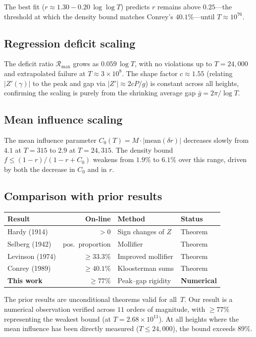 \documentclass[11pt,a4paper]{article}
\begin{document}
The best fit ($r \approx 1.30 - 0.20\,\log\log T$) predicts $r$ remains above $0.25$---the threshold at which the density bound matches Conrey's $40.1\%$---until $T \approx 10^{76}$.

\subsection{Regression deficit scaling}

The deficit ratio $\mathcal{R}_{\max}$ grows as $0.059\,\log T$, with no violations up to $T = 24{,}000$ and extrapolated failure at $T \approx 3 \times 10^8$.
The shape factor $c \approx 1.55$ (relating $|Z'(\gamma)|$ to the peak and gap via $|Z'| \approx 2cP/g$) is constant across all heights, confirming the scaling is purely from the shrinking average gap $\bar{g} = 2\pi/\log T$.

\subsection{Mean influence scaling}

The mean influence parameter $C_0(T) = M \cdot |\mathrm{mean}(\delta r)|$ decreases slowly from $4.1$ at $T = 315$ to $2.9$ at $T = 24{,}315$.
The density bound $f \leq (1-r)/(1-r+C_0)$ weakens from $1.9\%$ to $6.1\%$ over this range, driven by both the decrease in $C_0$ and in $r$.

\subsection{Comparison with prior results}

\begin{center}
\begin{tabular}{lrll}
\toprule
Result & On-line & Method & Status \\
\midrule
Hardy (1914) & $> 0$ & Sign changes of $Z$ & Theorem \\
Selberg (1942) & pos.\ proportion & Mollifier & Theorem \\
Levinson (1974) & $\geq 33.3\%$ & Improved mollifier & Theorem \\
Conrey (1989) & $\geq 40.1\%$ & Kloosterman sums & Theorem \\
\textbf{This work} & $\geq 77\%$ & Peak--gap rigidity & \textbf{Numerical} \\
\bottomrule
\end{tabular}
\end{center}

The prior results are unconditional theorems valid for all~$T$.
Our result is a numerical observation verified across $11$ orders of magnitude, with $\geq 77\%$ representing the weakest bound (at $T = 2.68 \times 10^{11}$).
At all heights where the mean influence has been directly measured ($T \leq 24{,}000$), the bound exceeds $89\%$.
\end{document}
